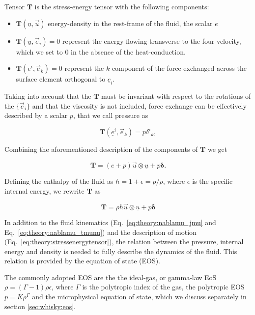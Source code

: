 \documentclass[11pt,a4paper,headinclude=true,DIV=14,BCOR=8mm,chapterprefix,listof=totoc,twoside,openright,abstracton]{scrbook}
\begin{document}
Tensor $\boldsymbol{T}$ is the stress-energy tensor with the following components: 

\begin{itemize}
    \item $\boldsymbol{T}(\underline{u}, \vec{u})$ energy-density in the rest-frame of the fluid, the scalar $e$
    \item $\boldsymbol{T}(\underline{u}, \vec{e}_i) = 0$ represent the energy flowing transverse to the four-velocity, which we set to $0$ in the absence of the heat-conduction.
    \item $\boldsymbol{T}(\underline{e}^i, \vec{e}_k) = 0$ represent the $k$ component of the force exchanged across the surface element orthogonal to $\underline{e}_i$.
\end{itemize}

Taking into account that the $\boldsymbol{T}$ must be invariant with respect to the rotations of the $\{\vec{e}_i\}$ and that the viscosity is not included, force exchange can be effectively described by a scalar $p$, that we call pressure as

\begin{equation}
\boldsymbol{T}(\underline{e}^i,\vec{e}_k) = p {\delta^i}_k,
\end{equation}

Combining the aforementioned description of the components of $\boldsymbol{T}$ we get

\begin{equation}
\boldsymbol{T} = (e + p)\vec{u}\otimes \underline{u} + p\boldsymbol{\delta}.
\end{equation}

Defining the enthalpy of the fluid as $h = 1 + \epsilon = p/\rho$, where $\epsilon$ is the specific internal energy, we rewrite $\boldsymbol{T}$ as 

\begin{equation}
\boldsymbol{T} = \rho h \vec{u}\otimes\underline{u} + p\boldsymbol{\delta}
\label{eq:theory:stressenergytensor}
\end{equation}

In addition to the fluid kinematics (Eq.~\eqref{eq:theory:nablamu_jmu} and Eq.~\eqref{eq:theory:nablamu_tmunu}) and the description of motion (Eq.~\eqref{eq:theory:stressenergytensor}), the relation between the pressure, internal energy and density is needed to fully describe the dynamics of the fluid. This relation is provided by the equation of state (EOS).

The commonly adopted EOS are the the ideal-gas, or gamma-law EoS $\rho = (\Gamma-1)\rho\epsilon$, where $\Gamma$ is the polytropic index of the gas, the polytropic EOS $p = K\rho^{\Gamma}$ and the microphysical equation of state, which we discuss separately in section \ref{sec:whisky:eos}.
\end{document}
